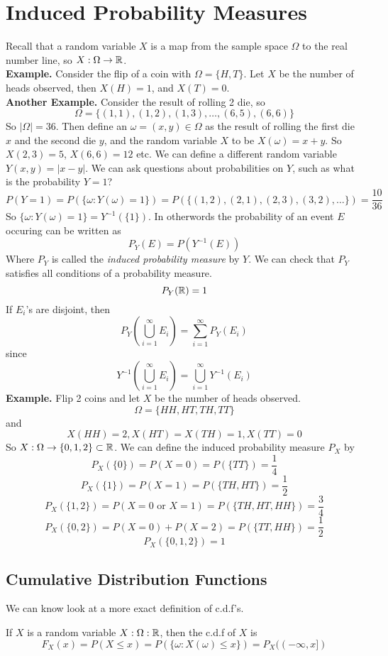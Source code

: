 \chapter{Induced Probability Measures}
Recall that a random variable $X$ is a map from the sample space $\Omega$ to the real number line, so $X: \Omega \rightarrow \mathbb{R}$.\\[2ex]
\textbf{Example.} Consider the flip of a coin with $\Omega = \{H,T\}$. Let $X$ be the number of heads observed, then $X(H) = 1$, and $X(T) = 0$.\\[2ex]
\textbf{Another Example.} Consider the result of rolling 2 die, so 
\[\Omega = \{(1,1), (1,2), (1,3), \ldots, (6,5), (6,6)\}\] 
So $|\Omega| = 36$. Then define an $\omega = (x,y) \in \Omega$ as the result of rolling the first die $x$ and the second die $y$, and the random variable $X$ to be $X(\omega) = x + y$. So $X(2,3) = 5$, $X(6,6) = 12$ etc. We can define a different random variable $Y(x,y) = |x-y|$. We can ask questions about probabilities on $Y$, such as what is the probability $Y = 1$? 
\[P(Y = 1) = P(\{\omega: Y(\omega) = 1\}) = P(\{(1,2),(2,1),(2,3),(3,2), \ldots\}) = \frac{10}{36}\]
So $\{\omega: Y(\omega) = 1\} = Y^{-1}(\{1\})$. In otherwords the probability of an event $E$ occuring can be written as 
\[P_Y(E) = P(Y^{-1}(E))\]  
Where $P_Y$ is called the \emph{induced probability measure} by $Y$. We can check that $P_Y$ satisfies all conditions of a probability measure.
\[P_Y(\mathbb{R}) = 1\]
If $E_i$'s are disjoint, then
\[P_Y\left(\bigcup_{i=1}^\infty E_i\right) = \sum_{i=1}^\infty P_Y(E_i)\]
since 
\[Y^{-1}\left(\bigcup_{i=1}^\infty E_i\right) = \bigcup_{i=1}^\infty Y^{-1}(E_i)\]
\noindent
\textbf{Example.} Flip 2 coins and let $X$ be the number of heads observed. 
\[\Omega = \{HH, HT, TH, TT\}\]
and 
\[X(HH) = 2, X(HT) = X(TH) = 1, X(TT) = 0\]
So $X: \Omega \rightarrow \{0,1,2\} \subset \mathbb{R}$. We can define the induced probability measure $P_X$ by
\[P_X(\{0\}) = P(X=0) = P(\{TT\}) = \frac{1}{4}\]
\[P_X(\{1\}) = P(X=1) = P(\{TH, HT\}) = \frac{1}{2}\]
\[P_X(\{1,2\}) = P(X=0 \text{ or } X = 1) = P(\{TH, HT, HH\}) = \frac{3}{4}\]
\[P_X(\{0,2\}) = P(X=0) + P(X = 2) = P(\{TT, HH\}) = \frac{1}{2}\]
\[P_X(\{0,1,2\}) = 1\]
\section{Cumulative Distribution Functions}
We can know look at a more exact definition of c.d.f's. 
\begin{definition}
    If $X$ is a random variable $X: \Omega: \mathbb{R}$, then the c.d.f of $X$ is
    \[F_X(x) = P(X \leq x) = P(\{\omega: X(\omega) \leq x\}) = P_X((-\infty, x])\] 
\end{definition}

